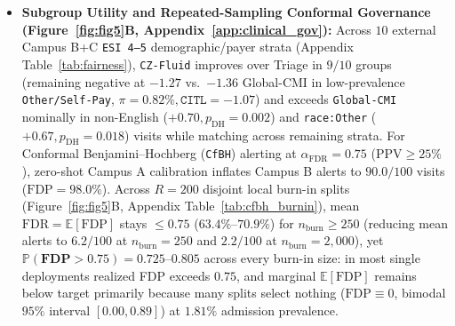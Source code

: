 \documentclass[11pt]{article}
\begin{document}
\begin{itemize}
  \item \textbf{Subgroup Utility and Repeated-Sampling Conformal Governance (Figure~\ref{fig:fig5}B, Appendix~\ref{app:clinical_gov}):} Across $10$ external Campus B+C \texttt{ESI 4--5} demographic/payer strata (Appendix Table~\ref{tab:fairness}), \texttt{CZ-Fluid} improves over Triage in $9/10$ groups (remaining negative at $-1.27$ vs.\ $-1.36$ Global-CMI in low-prevalence \texttt{Other/Self-Pay}, $\pi=0.82\%, \texttt{CITL}=-1.07$) and exceeds \texttt{Global-CMI} nominally in non-English ($+0.70, p_{\text{DH}}=0.002$) and \texttt{race:Other} ($+0.67, p_{\text{DH}}=0.018$) visits while matching across remaining strata. For Conformal Benjamini--Hochberg (\texttt{CfBH}) alerting at $\alpha_{\text{FDR}}=0.75$ ($\text{PPV}\ge 25\%$), zero-shot Campus A calibration inflates Campus B alerts to $90.0/100$ visits ($\text{FDP}=98.0\%$). Across $R=200$ disjoint local burn-in splits (Figure~\ref{fig:fig5}B, Appendix Table~\ref{tab:cfbh_burnin}), mean $\text{FDR} = \mathbb{E}[\text{FDP}]$ stays $\le 0.75$ ($63.4\%\text{--}70.9\%$) for $n_{\text{burn}} \ge 250$ (reducing mean alerts to $6.2/100$ at $n_{\text{burn}}=250$ and $2.2/100$ at $n_{\text{burn}}=2{,}000$), yet $\mathbf{\mathbb{P}(\text{FDP} > 0.75) = 0.725\text{--}0.805}$ across every burn-in size: in most single deployments realized FDP exceeds $0.75$, and marginal $\mathbb{E}[\text{FDP}]$ remains below target primarily because many splits select nothing ($\text{FDP} \equiv 0$, bimodal $95\%$ interval $[0.00, 0.89]$) at $1.81\%$ admission prevalence.
\end{itemize}
\end{document}
